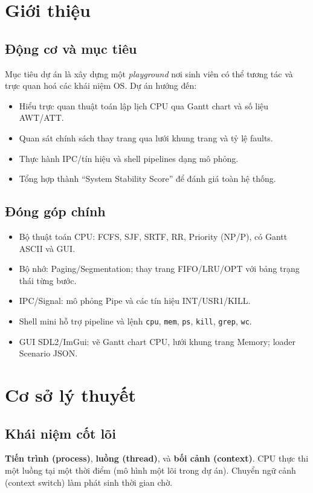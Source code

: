 \documentclass[12pt,a4paper]{report}
\begin{document}
\chapter{Giới thiệu}
\section{Động cơ và mục tiêu}
Mục tiêu dự án là xây dựng một \textit{playground} nơi sinh viên có thể tương tác và trực quan hoá các khái niệm OS. Dự án hướng đến:
\begin{itemize}[nosep]
  \item Hiểu trực quan thuật toán lập lịch CPU qua Gantt chart và số liệu AWT/ATT.
  \item Quan sát chính sách thay trang qua lưới khung trang và tỷ lệ faults.
  \item Thực hành IPC/tín hiệu và shell pipelines dạng mô phỏng.
  \item Tổng hợp thành “System Stability Score” để đánh giá toàn hệ thống.
\end{itemize}

\section{Đóng góp chính}
\begin{itemize}[nosep]
  \item Bộ thuật toán CPU: FCFS, SJF, SRTF, RR, Priority (NP/P), có Gantt ASCII và GUI.
  \item Bộ nhớ: Paging/Segmentation; thay trang FIFO/LRU/OPT với bảng trạng thái từng bước.
  \item IPC/Signal: mô phỏng Pipe và các tín hiệu INT/USR1/KILL.
  \item Shell mini hỗ trợ pipeline và lệnh \verb|cpu|, \verb|mem|, \verb|ps|, \verb|kill|, \verb|grep|, \verb|wc|.
  \item GUI SDL2/ImGui: vẽ Gantt chart CPU, lưới khung trang Memory; loader Scenario JSON.
\end{itemize}

\chapter{Cơ sở lý thuyết}
\section{Khái niệm cốt lõi}
\textbf{Tiến trình (process)}, \textbf{luồng (thread)}, và \textbf{bối cảnh (context)}. CPU thực thi một luồng tại một thời điểm (mô hình một lõi trong dự án). Chuyển ngữ cảnh (context switch) làm phát sinh thời gian chờ.
\end{document}
